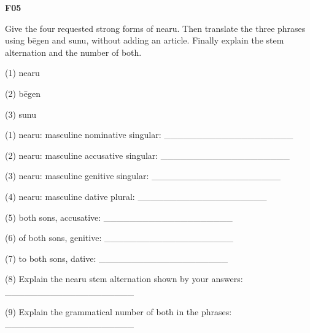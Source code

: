\par\begin{minipage}{\linewidth}\raggedright
\textbf{F05}

Give the four requested strong forms of nearu. Then translate the three phrases using bēgen and sunu, without adding an article. Finally explain the stem alternation and the number of both.

(1) nearu

(2) bēgen

(3) sunu

(1) nearu: masculine nominative singular: \_\_\_\_\_\_\_\_\_\_\_\_\_\_\_\_\_\_\_\_

(2) nearu: masculine accusative singular: \_\_\_\_\_\_\_\_\_\_\_\_\_\_\_\_\_\_\_\_

(3) nearu: masculine genitive singular: \_\_\_\_\_\_\_\_\_\_\_\_\_\_\_\_\_\_\_\_

(4) nearu: masculine dative plural: \_\_\_\_\_\_\_\_\_\_\_\_\_\_\_\_\_\_\_\_

(5) both sons, accusative: \_\_\_\_\_\_\_\_\_\_\_\_\_\_\_\_\_\_\_\_

(6) of both sons, genitive: \_\_\_\_\_\_\_\_\_\_\_\_\_\_\_\_\_\_\_\_

(7) to both sons, dative: \_\_\_\_\_\_\_\_\_\_\_\_\_\_\_\_\_\_\_\_

(8) Explain the nearu stem alternation shown by your answers: \_\_\_\_\_\_\_\_\_\_\_\_\_\_\_\_\_\_\_\_

(9) Explain the grammatical number of both in the phrases: \_\_\_\_\_\_\_\_\_\_\_\_\_\_\_\_\_\_\_\_

\end{minipage}\par\addvspace{4pt}

